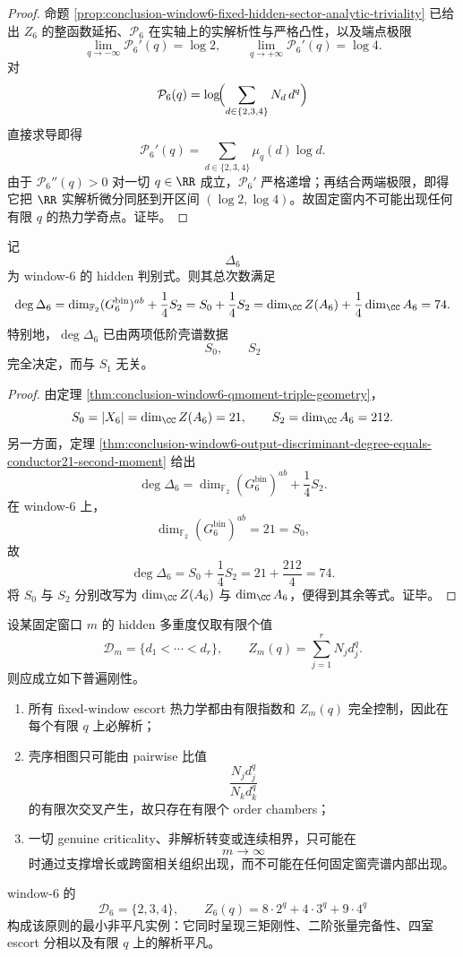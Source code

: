 \begin{proof}
命题 \ref{prop:conclusion-window6-fixed-hidden-sector-analytic-triviality} 已给出 \(Z_6\) 的整函数延拓、\(\mathcal P_6\) 在实轴上的实解析性与严格凸性，以及端点极限
\[
\lim_{q\to-\infty}\mathcal P_6'(q)=\log 2,
\qquad
\lim_{q\to+\infty}\mathcal P_6'(q)=\log 4.
\]
对
\[
\mathcal P_6(q)=\log\!\Bigl(\sum_{d\in\{2,3,4\}}N_d\,d^q\Bigr)
\]
直接求导即得
\[
\mathcal P_6'(q)=\sum_{d\in\{2,3,4\}}\mu_q(d)\log d.
\]
由于 \(\mathcal P_6''(q)>0\) 对一切 \(q\in\RR\) 成立，\(\mathcal P_6'\) 严格递增；再结合两端极限，即得它把 \(\RR\) 实解析微分同胚到开区间 \((\log 2,\log 4)\)。故固定窗内不可能出现任何有限 \(q\) 的热力学奇点。证毕。
\end{proof}

\begin{theorem}\label{thm:conclusion-window6-discriminant-degree-lowmoment-closure}
记
\[
\Delta_6
\]
为 window-\(6\) 的 hidden 判别式。则其总次数满足
\[
\deg \Delta_6
=
\dim_{\mathbb F_2}(G_6^{\mathrm{bin}})^{ab}+\frac14 S_2
=
S_0+\frac14 S_2
=
\dim_{\CC}Z(A_6)+\frac14\dim_{\CC}A_6
=74.
\]
特别地，\(\deg\Delta_6\) 已由两项低阶壳谱数据
\[
S_0,\qquad S_2
\]
完全决定，而与 \(S_1\) 无关。
\end{theorem}

\begin{proof}
由定理 \ref{thm:conclusion-window6-qmoment-triple-geometry}，
\[
S_0=|X_6|=\dim_{\CC}Z(A_6)=21,
\qquad
S_2=\dim_{\CC}A_6=212.
\]
另一方面，定理 \ref{thm:conclusion-window6-output-discriminant-degree-equals-conductor21-second-moment} 给出
\[
\deg\Delta_6
=
\dim_{\mathbb F_2}(G_6^{\mathrm{bin}})^{ab}+\frac14 S_2.
\]
在 window-\(6\) 上，
\[
\dim_{\mathbb F_2}(G_6^{\mathrm{bin}})^{ab}=21=S_0,
\]
故
\[
\deg\Delta_6=S_0+\frac14 S_2=21+\frac{212}{4}=74.
\]
将 \(S_0\) 与 \(S_2\) 分别改写为 \(\dim_{\CC}Z(A_6)\) 与 \(\dim_{\CC}A_6\)，便得到其余等式。证毕。
\end{proof}

\begin{conjecture}\label{conj:conclusion-fixedwindow-finitesupport-escort-rigidity}
设某固定窗口 \(m\) 的 hidden 多重度仅取有限个值
\[
\mathcal D_m=\{d_1<\cdots<d_r\},
\qquad
Z_m(q)=\sum_{j=1}^r N_j d_j^q.
\]
则应成立如下普遍刚性。

\begin{enumerate}
\item 所有 fixed-window escort 热力学都由有限指数和 \(Z_m(q)\) 完全控制，因此在每个有限 \(q\) 上必解析；
\item 壳序相图只可能由 pairwise 比值
\[
\frac{N_jd_j^q}{N_kd_k^q}
\]
的有限次交叉产生，故只存在有限个 order chambers；
\item 一切 genuine criticality、非解析转变或连续相界，只可能在
\[
m\to\infty
\]
时通过支撑增长或跨窗相关组织出现，而不可能在任何固定窗壳谱内部出现。
\end{enumerate}

window-\(6\) 的
\[
\mathcal D_6=\{2,3,4\},
\qquad
Z_6(q)=8\cdot 2^q+4\cdot 3^q+9\cdot 4^q
\]
构成该原则的最小非平凡实例：它同时呈现三矩刚性、二阶张量完备性、四室 escort 分相以及有限 \(q\) 上的解析平凡。
\end{conjecture}
